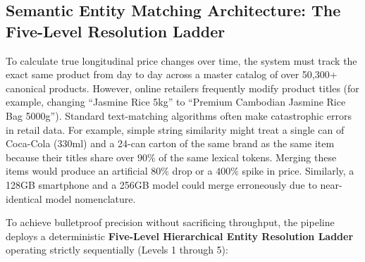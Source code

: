 \subsection{Semantic Entity Matching Architecture: The Five-Level Resolution Ladder}
\hs To calculate true longitudinal price changes over time, the system must track the exact same product from day to day across a master catalog of over 50,300+ canonical products. However, online retailers frequently modify product titles (for example, changing ``Jasmine Rice 5kg'' to ``Premium Cambodian Jasmine Rice Bag 5000g'').
\hs Standard text-matching algorithms often make catastrophic errors in retail data. For example, simple string similarity might treat a single can of Coca-Cola (330ml) and a 24-can carton of the same brand as the same item because their titles share over $90\%$ of the same lexical tokens. Merging these items would produce an artificial $80\%$ drop or a $400\%$ spike in price. Similarly, a 128GB smartphone and a 256GB model could merge erroneously due to near-identical model nomenclature.

\hs To achieve bulletproof precision without sacrificing throughput, the pipeline deploys a deterministic \textbf{Five-Level Hierarchical Entity Resolution Ladder} operating strictly sequentially (Levels 1 through 5):

